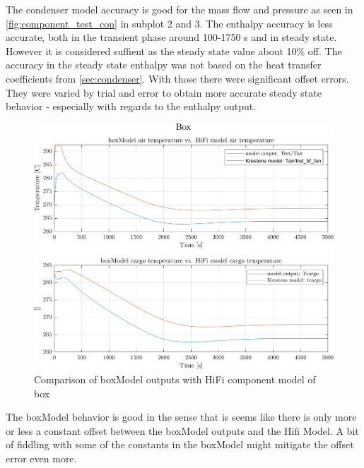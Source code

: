 The condenser model accuracy is good for the mass flow and pressure as seen in \cref{fig:component_test_con} in subplot 2 and 3. The enthalpy accuracy is less accurate, both in the transient phase around 100-1750 s and in steady state. However it is considered suffient as the steady state value about 10\% off.
The accuracy in the steady state enthalpy was not based on the heat transfer coefficients from \cref{sec:condenser}. With those there were significant offset errors. They were varied by trial and error to obtain more accurate steady state behavior - especially with regards to the enthalpy output.


\clearpage
\begin{figure}[h]
	\centering
	\includegraphics[width=1\textwidth]{Graphics/comp_test_box.png}
	\caption{Comparison of boxModel outputs with HiFi component model of box}
	\label{fig:component_test_box}
\end{figure}

The boxModel behavior is good in the sense that is seems like there is only more or less a constant offset between the boxModel outputs and the Hifi Model. A bit of fiddling with some of the constants in the boxModel might mitigate the offset error even more.

